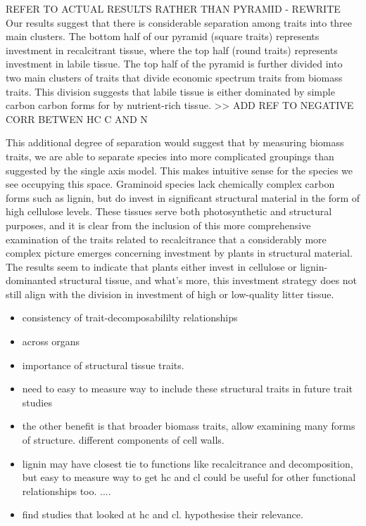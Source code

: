 \documentclass{article}
\begin{document}
REFER TO ACTUAL RESULTS RATHER THAN PYRAMID - REWRITE
Our results suggest that there is considerable separation among traits into three main clusters. The bottom half of our pyramid (square traits) represents investment in recalcitrant tissue, where the top half (round traits) represents investment in labile tissue. The top half of the pyramid is further divided into two main clusters of traits that divide economic spectrum traits from biomass traits. This division suggests that labile tissue is either dominated by simple carbon carbon forms for by nutrient-rich tissue. >> ADD REF TO NEGATIVE CORR BETWEN HC C AND N

This additional degree of separation would suggest that by measuring biomass traits, we are able to separate species into more complicated groupings than suggested by the single axis model. This makes intuitive sense for the species we see occupying this space. Graminoid species lack chemically complex carbon forms such as lignin, but do invest in significant structural material in the form of high cellulose levels. These tissues serve both photosynthetic and structural purposes, and it is clear from the inclusion of this more comprehensive examination of the traits related to recalcitrance that a considerably more complex picture emerges concerning investment by plants in structural material. The results seem to indicate that plants either invest in cellulose or lignin-dominanted structural tissue, and what's more, this investment strategy does not still align with the division in investment of high or low-quality litter tissue. 

\begin{itemize}
	\item consistency of trait-decomposabililty relationships
	\item across organs
	\item importance of structural tissue traits. 
	\item need to easy to measure way to include these structural traits in future trait studies
	\item the other benefit is that broader biomass traits, allow examining many forms of structure. different components of cell walls. 
	\item lignin may have closest tie to functions like recalcitrance and decomposition, but easy to measure way to get hc and cl could be useful for other functional relationships too. .... 
	\item find studies that looked at hc and cl. hypothesise their relevance. 

\end{itemize}
\end{document}
